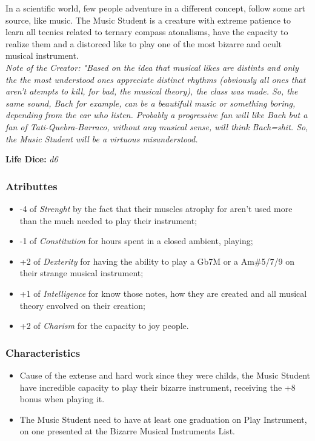 \documentclass[ letterpaper,12pt]{article}
\begin{document}
In  a  scientific   world,   few   people adventure in a different  concept, follow some art source, like  music.  The  Music Student  is  a  creature   with   extreme patience to learn all tecnics related  to ternary  compass  atonalisms,  have   the capacity to realize them and  a distorced like to play one of the most bizarre  and ocult musical instrument. \\

{\it Note of the Creator: "Based  on  the idea that musical likes are distints  and only the the most understood  ones  appreciate distinct rhythms (obviously all ones that aren't  atempts  to   kill,  for bad, the musical theory), the class was made.  So, the same sound, Bach for example, can  be a beautifull music or  something  boring, depending  from  the  ear   who   listen. Probably a progressive fan will like Bach but a fan of Tati-Quebra-Barraco, without any musical sense, will think  Bach=shit. So, the Music Student will be a  virtuous misunderstood.}

{\bf Life Dice: }{\it d6}\\ 

\subsubsection{Atributtes}
\begin{itemize}
\item{-4 of {\it Strenght} by  the fact  that their muscles atrophy for aren't used more than the much needed to play their instrument;}
\item{-1 of {\it Constitution} for hours  spent  in a closed ambient, playing;}
\item{+2 of {\it Dexterity} for having the ability to play  a  Gb7M  or  a  Am\#5/7/9  on  their strange musical instrument;}
\item{+1 of {\it Intelligence} for  know those notes, how  they  are  created  and  all musical theory envolved on their creation;}
\item{+2 of {\it Charism} for  the  capacity  to joy people.}
\end{itemize}

\subsubsection{Characteristics}
\begin{itemize}
\item{Cause of the extense and hard work  since they were childs, the Music Student  have incredible   capacity   to   play   their bizarre  instrument,  receiving  the   +8 bonus when playing it.}
\item{The Music Student need to have  at  least one graduation on Play Instrument, on one presented  at   the    Bizarre    Musical Instruments List.}
\end{itemize}
\end{document}
